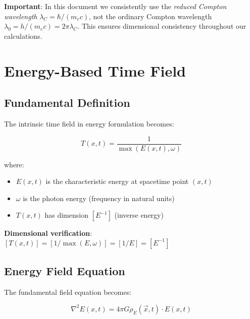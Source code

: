 \documentclass[12pt,a4paper]{article}
\newcommand{\checked}{\checkmark}
\newcommand{\Tfield}{T(x,t)}
\newcommand{\Efield}{E(x,t)}
\newcommand{\vecx}{\vec{x}}
\begin{document}
	
	
	\begin{tcolorbox}[colback=blue!5!white,colframe=blue!75!black,title=Notation Convention]
		\textbf{Important}: In this document we consistently use the \textit{reduced Compton wavelength} $\lambda_C = \hbar/(m_e c)$, not the ordinary Compton wavelength $\lambda_0 = h/(m_e c) = 2\pi\lambda_C$. This ensures dimensional consistency throughout our calculations.
	\end{tcolorbox}
	
	\section{Energy-Based Time Field}
	\label{sec:energy_time_field}
	
	\subsection{Fundamental Definition}
	\label{subsec:fundamental_definition}
	
	The intrinsic time field in energy formulation becomes:
	
	\begin{equation}
		\boxed{\Tfield = \frac{1}{\max(\Efield, \omega)}}
		\label{eq:energy_time_field}
	\end{equation}
	
	where:
	\begin{itemize}
		\item $\Efield$ is the characteristic energy at spacetime point $(x,t)$
		\item $\omega$ is the photon energy (frequency in natural units)
		\item $\Tfield$ has dimension $[E^{-1}]$ (inverse energy)
	\end{itemize}
	
	\textbf{Dimensional verification}: $[\Tfield] = [1/\max(E,\omega)] = [1/E] = [E^{-1}]$ \checked
	
	\subsection{Energy Field Equation}
	\label{subsec:energy_field_equation}
	
	The fundamental field equation becomes:
	
	\begin{equation}
		\boxed{\nabla^2 \Efield = 4\pi G \rho_E(\vecx,t) \cdot \Efield}
		\label{eq:energy_field_equation}
	\end{equation}
	
\end{document}

